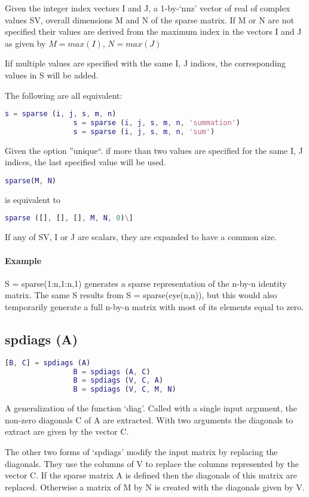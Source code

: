 \documentclass[a4paper]{scrartcl}
\begin{document}
			Given the integer index vectors I and J, a 1-by-`nnz' vector of
			real of complex values SV, overall dimensions M and N of the
			sparse matrix.  If M or N are not specified their
			values are derived from the maximum index in the vectors I and J
			as given by $M = max (I)$, $N = max (J)$

			Iif multiple values are specified with the same I, J
			indices, the corresponding values in S will be added.

			The following are all equivalent:
			\begin{lstlisting}[language=matlab]
				s = sparse (i, j, s, m, n)
				s = sparse (i, j, s, m, n, 'summation')
				s = sparse (i, j, s, m, n, 'sum')
			\end{lstlisting}
			Given the option ''unique``. if more than two values are specified
			for the same I, J indices, the last specified value will be used.
			\begin{lstlisting}[language=matlab]
				sparse(M, N)
			\end{lstlisting}
			is equivalent to
			\begin{lstlisting}[language=matlab]
				sparse ([], [], [], M, N, 0)\]
			\end{lstlisting}

			If any of SV, I or J are scalars, they are expanded to have a
			common size.
		\paragraph{Example} S = sparse(1:n,1:n,1) generates a sparse representation of the n-by-n identity matrix. The same S results from S = sparse(eye(n,n)), but this would also temporarily generate a full n-by-n matrix with most of its elements equal to zero.
	\subsection{spdiags (A)}
			\begin{lstlisting}[language=matlab]
				[B, C] = spdiags (A)
				B = spdiags (A, C)
				B = spdiags (V, C, A)
				B = spdiags (V, C, M, N)
			\end{lstlisting}
			A generalization of the function `diag'.  Called with a single
			input argument, the non-zero diagonals C of A are extracted.  With
			two arguments the diagonals to extract are given by the vector C.

			The other two forms of `spdiags' modify the input matrix by
			replacing the diagonals.  They use the columns of V to replace the
			columns represented by the vector C.  If the sparse matrix A is
			defined then the diagonals of this matrix are replaced.  Otherwise
			a matrix of M by N is created with the diagonals given by V.
\end{document}
